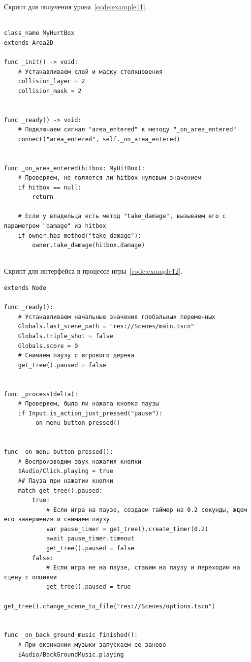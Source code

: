\label{{subsec:ch02/sec01/sub12}Подраздел 12. Скрипт для получения урона}
Скрипт для получения урона~\ref{code:example11}.
\begin{code}
\vspace{-\baselineskip}\begin{verbatim}

class_name MyHurtBox
extends Area2D

func _init() -> void:
    # Устанавливаем слой и маску столкновения
    collision_layer = 2
    collision_mask = 2


func _ready() -> void:
    # Подключаем сигнал "area_entered" к методу "_on_area_entered"
    connect("area_entered", self._on_area_entered)


func _on_area_entered(hitbox: MyHitBox):
    # Проверяем, не является ли hitbox нулевым значением
    if hitbox == null:
        return

    # Если у владельца есть метод "take_damage", вызываем его с параметром "damage" из hitbox
    if owner.has_method("take_damage"):
        owner.take_damage(hitbox.damage)


\end{verbatim}
\end{code}

\label{{subsec:ch02/sec01/sub13}Подраздел 13. Скрипт для интерфейса в процессе игры}
Скрипт для интерфейса в процессе игры~\ref{code:example12}.
\begin{code}
\vspace{-\baselineskip}\begin{verbatim}
extends Node

func _ready():
    # Устанавливаем начальные значения глобальных переменных
    Globals.last_scene_path = "res://Scenes/main.tscn"
    Globals.triple_shot = false
    Globals.score = 0
    # Снимаем паузу с игрового дерева
    get_tree().paused = false


func _process(delta):
    # Проверяем, была ли нажата кнопка паузы
    if Input.is_action_just_pressed("pause"):
        _on_menu_button_pressed()


func _on_menu_button_pressed():
    # Воспроизводим звук нажатия кнопки
    $Audio/Click.playing = true
    ## Пауза при нажатии кнопки
    match get_tree().paused:
        true:
            # Если игра на паузе, создаем таймер на 0.2 секунды, ждем его завершения и снимаем паузу
            var pause_timer = get_tree().create_timer(0.2)
            await pause_timer.timeout
            get_tree().paused = false
        false:
            # Если игра не на паузе, ставим на паузу и переходим на сцену с опциями
            get_tree().paused = true
            get_tree().change_scene_to_file("res://Scenes/options.tscn")


func _on_back_ground_music_finished():
    # При окончании музыки запускаем ее заново
    $Audio/BackGroundMusic.playing

\end{verbatim}
\end{code}

